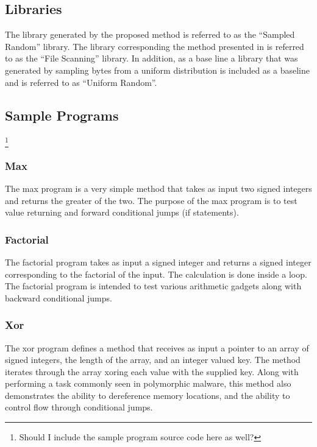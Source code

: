 \documentclass[finalcopy,short]{srpaper}
\begin{document}
        \subsection{Libraries}

            The library generated by the proposed method is referred to as the
            ``Sampled Random'' library. The library corresponding the method
            presented in \cite{franken} is referred to as the ``File Scanning''
            library. In addition, as a base line a library that was generated by
            sampling bytes from a uniform distribution is included as a baseline
            and is referred to as ``Uniform Random''.
        
        \subsection{Sample Programs}
        \footnote{Should I include the sample program source code here as well?}

            \subsubsection{Max}

                The max program is a very simple method that takes as input two
                signed integers and returns the greater of the two. The purpose
                of the max program is to test value returning and forward
                conditional jumps (if statements).

            \subsubsection{Factorial}

                The factorial program takes as input a signed integer and
                returns a signed integer corresponding to the factorial of the
                input. The calculation is done inside a loop. The factorial
                program is intended to test various arithmetic gadgets along
                with backward conditional jumps.

            \subsubsection{Xor}

                The xor program defines a method that receives as input a
                pointer to an array of signed integers, the length of the array,
                and an integer valued key. The method iterates through the array
                xoring each value with the supplied key. Along with performing a
                task commonly seen in polymorphic malware, this method also
                demonstrates the ability to dereference memory locations, and
                the ability to control flow through conditional jumps.
            
\end{document}
